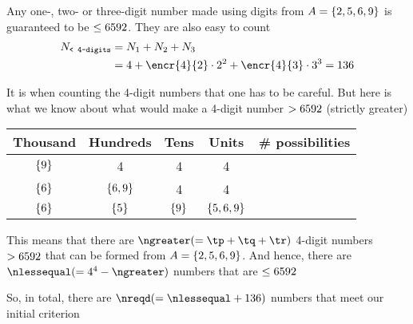 \begin{solution}[\halfpage]
	Any one-, two- or three-digit number made using digits from $A=\lbrace 2,5,6,9 \rbrace$ 
	is guaranteed to be $\leq 6592$. They are also easy to count
	\begin{align}
		N_{\texttt{< 4-digits}} &= N_1 + N_2 + N_3 \\ 
		 &= 4 + \encr{4}{2}\cdot 2^2 + \encr{4}{3}\cdot 3^3 = 136
	\end{align}
	
	It is when counting the 4-digit numbers that one has to be careful. But here is what we know about what 
	would make a 4-digit number $ > 6592$ (strictly greater)
	
	
	\begin{tabular}{ccccc}
		\toprule
		Thousand & Hundreds & Tens & Units & \# possibilities \\
		\midrule
		$\lbrace9\rbrace$ & 4 & 4 & 4 & \tp \\ %
		$\lbrace6\rbrace$ & $\lbrace6,9\rbrace$ & 4 & 4 & \tq \\ %
		$\lbrace6\rbrace$ & $\lbrace5\rbrace$ & $\lbrace9\rbrace$ & $\lbrace5,6,9\rbrace$ & \tr \\ %
	    \bottomrule
	\end{tabular}
	
	This means that there are $\ngreater (= \tp + \tq + \tr)$ 4-digit numbers $ > 6592$ that can be formed from 
	$A = \lbrace2,5,6,9\rbrace$. And hence, there are $\nlessequal( = 4^4 - \ngreater)$ numbers that are $ \leq 6592$
	
	So, in total, there are $\nreqd (= \nlessequal + 136)$ numbers that meet our initial criterion
	
\end{solution}
